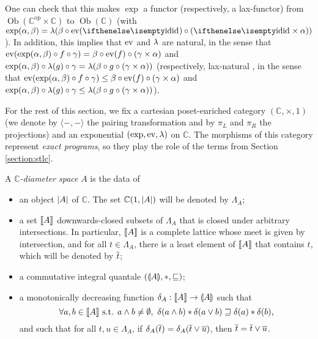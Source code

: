 One can check that this makes $\exp$ a functor (respectively, a lax-functor) from $\operatorname{Ob}(\mathbb{C}^{\operatorname{op}} \times \mathbb{C})$ to $\operatorname{Ob}(\mathbb{C})$ (with
$\exp(\alpha,\beta)=\lam(\beta\circ\ev(\id)\circ(\id\times\alpha))$). In addition, this implies that $\operatorname{ev}$ and $\lambda$ are natural, in the sense that $\operatorname{ev}(\exp(\alpha,\beta)\circ f\circ\gamma) = \beta\circ\operatorname{ev}(f)\circ(\gamma\times\alpha)$ and $\exp(\alpha,\beta)\circ\lambda(g)\circ\gamma = \lambda(\beta\circ g\circ(\gamma\times\alpha))$ (respectively, lax-natural \cite{hilken:2-lambda}, in the sense that $\operatorname{ev}(\exp(\alpha,\beta)\circ f\circ\gamma) \leq \beta\circ\operatorname{ev}(f)\circ(\gamma\times\alpha)$ and $\exp(\alpha,\beta)\circ\lambda(g)\circ\gamma \leq \lambda(\beta\circ g\circ(\gamma\times\alpha))$).

For the rest of this section, we fix a cartesian poset-enriched category $(\mathbb{C}, \times, 1)$ (we denote by $\langle-,-\rangle$ the pairing transformation and by $\pi_L$ and $\pi_R$ the projections) and an exponential $(\exp, \operatorname{ev}, \lambda)$ on $\mathbb{C}$. The morphisms of this category represent \emph{exact programs}, so they play the role of the terms from Section \ref{section:stlc}.

\begin{definition} A \emph{$\mathbb{C}$-diameter space} $A$ is the data of \begin{itemize}
\item an object $\left\vert A\right\vert$ of $\mathbb{C}$. The set $\mathbb{C}(1,\left\vert A\right\vert)$ will be denoted by $\Lambda_A$;
\item a set $\llbracket A \rrbracket$ downwards-closed subsets of $\Lambda_A$ that is closed under arbitrary intersections. In particular, $\llbracket A \rrbracket$ is a complete lattice whose meet is given by intersection, and for all $t\in\Lambda_A$, there is a least element of $\llbracket A \rrbracket$ that contains $t$, which will be denoted by $\overline{t}$;
\item a commutative integral quantale $(\llparenthesis A \rrparenthesis, \mathbin{\ast}, \sqsubseteq)$;
\item a monotonically decreasing function $\delta_A : \llbracket A \rrbracket \to \llparenthesis A \rrparenthesis$ such that $$\forall a,b \in \llbracket A \rrbracket \text{ s.t. } a \wedge b \neq \emptyset,~ \delta(a \wedge b) \mathbin{\ast} \delta(a \vee b) \sqsupseteq \delta(a) \mathbin{\ast} \delta(b)\text{,}$$
and such that for all $t,u \in \Lambda_A$, if $\delta_A(\overline{t}) = \delta_A(\overline{t} \vee \overline{u})$, then $\overline{t} = \overline{t} \vee \overline{u}$.
\end{itemize}
\end{definition}

